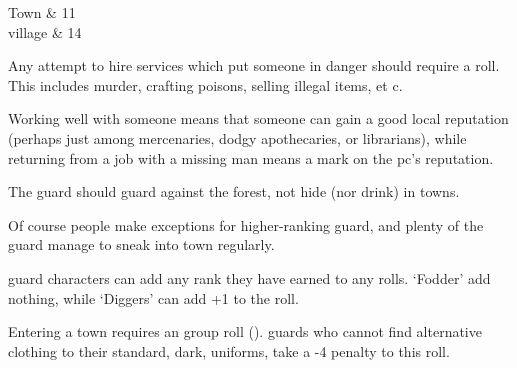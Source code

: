 \begin{multicols}{2}
{\begin{boxtable}[lY]
    Town & 11 \\

    \Gls{village} & 14 \\

  \end{boxtable}
}

Any attempt to hire services which put someone in danger should require a roll.
This includes murder, crafting poisons, selling illegal items, et c.

Working well with someone means that someone can gain a good local reputation (perhaps just among mercenaries, dodgy apothecaries, or librarians), while returning from a job with a missing man means a mark on the \gls{pc}'s reputation.

The \gls{guard} should guard against the forest, not hide (nor drink) in towns.


Of course people make exceptions for higher-ranking \gls{guard}, and plenty of the guard manage to sneak into town regularly.

\Gls{guard} characters can add any rank they have earned to any rolls.
`Fodder' add nothing, while `Diggers' can add +1 to the roll.

Entering a town requires an  group roll (\tn[7]).
\Glspl{guard} who cannot find alternative clothing to their standard, dark, uniforms, take a -4 penalty to this roll.


\end{multicols}
